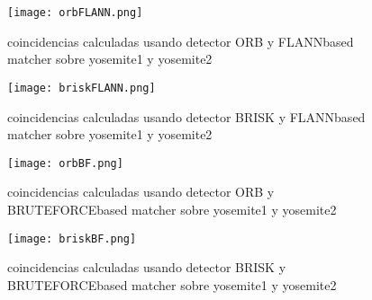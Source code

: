 \begin{figure}[H] %
\centering
\texttt{[image: orbFLANN.png]}  %
\label{figura1}
\caption{coincidencias calculadas usando detector ORB y FLANNbased matcher sobre yosemite1 y yosemite2}
\end{figure}

\begin{figure}[H] %
\centering
\texttt{[image: briskFLANN.png]}  %
\label{figura1}
\caption{coincidencias calculadas usando detector BRISK y FLANNbased matcher sobre yosemite1 y yosemite2}
\end{figure}

\begin{figure}[H] %
\centering
\texttt{[image: orbBF.png]}  %
\label{figura1}
\caption{coincidencias calculadas usando detector ORB y BRUTEFORCEbased matcher sobre yosemite1 y yosemite2}
\end{figure}

\begin{figure}[H] %
\centering
\texttt{[image: briskBF.png]}  %
\label{figura1}
\caption{coincidencias calculadas usando detector BRISK y BRUTEFORCEbased matcher sobre yosemite1 y yosemite2}
\end{figure}



